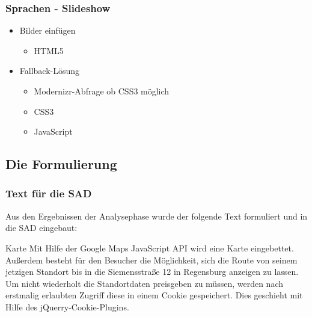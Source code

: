 \begin{frame} %
  \frametitle{Sprachen - Slideshow} %

   \begin{itemize}
    
    \item Bilder einfügen
        \begin{itemize}
         \item HTML5
        \end{itemize}
    
    \item Fallback-Lösung
    	\begin{itemize}
     	\item Modernizr-Abfrage ob CSS3 möglich
     	\item CSS3
     	\item JavaScript
    	\end{itemize}
   
    
   \end{itemize}

\end{frame}







\subsection{Die Formulierung}
\begin{frame} %
  \frametitle{Text für die SAD} %

  Aus den Ergebnissen der Analysephase wurde der folgende Text formuliert und in die SAD eingebaut:

  \begin{block}{Karte}
	Mit Hilfe der Google Maps JavaScript API wird eine Karte eingebettet. Außerdem besteht für den Besucher die
	Möglichkeit, sich die Route von seinem jetzigen Standort bis in die Siemensstraße 12 in Regensburg anzeigen zu
	lassen. Um nicht wiederholt die Standortdaten preisgeben zu müssen, werden nach erstmalig erlaubten Zugriff
	diese in einem Cookie gespeichert. Dies geschieht mit Hilfe des jQuerry-Cookie-Plugins.
  \end{block}
  

\end{frame}


